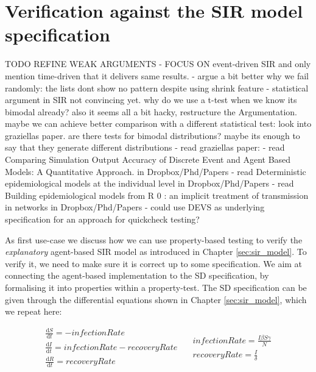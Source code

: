 \chapter{Verification against the SIR model specification}
\label{ch:prop_explanatory}

TODO REFINE WEAK ARGUMENTS
- FOCUS ON event-driven SIR and only mention time-driven that it delivers same results.
- argue a bit better why we fail randomly: the lists dont show no pattern despite using shrink feature
- statistical argument in SIR not convincing yet. why do we use a t-test when we know its bimodal already? also it seems all a bit hacky, restructure the Argumentation. maybe we can achieve better comparison with a different statistical test: look into graziellas paper. are there tests for bimodal distributions? maybe its enough to say that they generate different distributions
- read graziellas paper: \cite{figueredo_comparing_2014}
- read Comparing Simulation Output Accuracy of Discrete Event and Agent Based Models: A Quantitative Approach. in Dropbox/Phd/Papers
- read Deterministic epidemiological models at the individual level in Dropbox/Phd/Papers
- read Building epidemiological models from R 0 : an implicit treatment of transmission in networks in Dropbox/Phd/Papers
- could use DEVS as underlying specification for an approach for quickcheck testing?

As first use-case we discuss how we can use property-based testing to verify the \textit{explanatory} agent-based SIR model as introduced in Chapter \ref{sec:sir_model}. To verify it, we need to make sure it is correct up to some specification. We aim at connecting the agent-based implementation to the SD specification, by formalising it into properties within a property-test. The SD specification can be given through the differential equations shown in Chapter \ref{sec:sir_model}, which we repeat here:

\begin{equation}
\begin{split}
\frac{\mathrm d S}{\mathrm d t} = -infectionRate \\
\frac{\mathrm d I}{\mathrm d t} = infectionRate - recoveryRate \\
\frac{\mathrm d R}{\mathrm d t} = recoveryRate 
\end{split}
\quad
\begin{split}
infectionRate = \frac{I \beta S \gamma}{N} \\
recoveryRate = \frac{I}{\delta} 
\end{split}
\end{equation}
\label{eq:sir_delta_rates}


